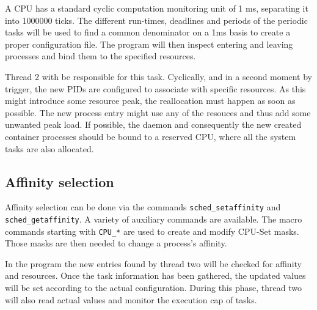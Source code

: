 \documentclass[]{scrartcl}
\begin{document}
A CPU has a standard cyclic computation monitoring unit of 1 ms, separating it into 1000000 ticks. 
The different run-times, deadlines and periods of the periodic tasks will be used to find a common denominator on a 1ms basis to create a proper configuration file. 
The program will then inspect entering and leaving processes and bind them to the specified resources.

Thread 2 with be responsible for this task. Cyclically, and in a second moment by trigger, the new PIDs are configured to associate with specific resources.
As this might introduce some resource peak, the reallocation must happen as soon as possible. 
The new process entry might use any of the resouces and thus add some unwanted peak load. 
If possible, the daemon and consequently the new created container processes should be bound to a reserved {CPU}, where all the system tasks are also allocated.

\subsection{Affinity selection}

Affinity selection can be done via the commands \texttt{sched\_setaffinity} and \texttt{sched\_getaffinity}.
A variety of auxiliary commands are available. 
The macro commands starting with \texttt{CPU\_*} are used to create and modify CPU-Set masks.
Those masks are then needed to change a process's affinity.

In the program the new entries found by thread two will be checked for affinity and resources.
Once the task information has been gathered, the updated values will be set according to the actual configuration.
During this phase, thread two will also read actual values and monitor the execution cap of tasks.

\end{document}
